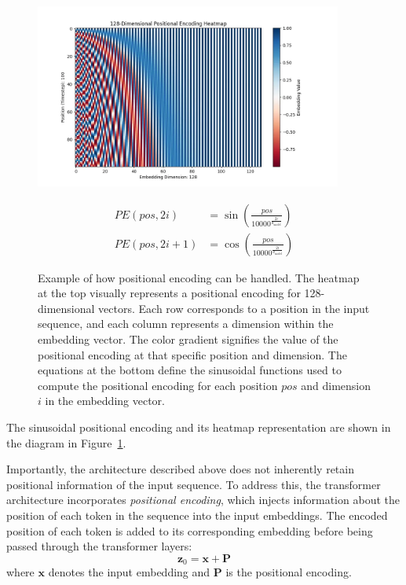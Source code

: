 \documentclass{pracalicmgr}
\begin{document}
\begin{figure}[H]
    \centering
    \begin{minipage}{\textwidth}
        \centering
        \includegraphics[width=0.9\textwidth]{src/embedings.png}
    \end{minipage}
    \vspace{0.2cm}
    \begin{minipage}{\textwidth}
        \centering
        \begin{align*}
        PE(pos, 2i) &= \sin\left(\frac{pos}{10000^{\frac{2i}{d_{\text{model}}}}}\right) \\
        PE(pos, 2i + 1) &= \cos\left(\frac{pos}{10000^{\frac{2i}{d_{\text{model}}}}}\right)
        \end{align*}
    \end{minipage}
    \label{fig:positionalEncoding}
    \caption{Example of how positional encoding can be handled. The heatmap at the top visually represents a positional encoding for 128-dimensional vectors. Each row corresponds to a position in the input sequence, and each column represents a dimension within the embedding vector. The color gradient signifies the value of the positional encoding at that specific position and dimension. The equations at the bottom define the sinusoidal functions used to compute the positional encoding for each position \( pos \) and dimension \( i \) in the embedding vector.}
\end{figure}

The sinusoidal positional encoding and its heatmap representation are shown in the diagram in Figure~\ref{fig:positionalEncoding}.

Importantly, the architecture described above does not inherently retain positional information of the input sequence. To address this, the transformer architecture incorporates \textit{positional encoding}, which injects information about the position of each token in the sequence into the input embeddings. The encoded position of each token is added to its corresponding embedding before being passed through the transformer layers:
\[
\mathbf{z}_0 = \mathbf{x} + \mathbf{P}
\]
where \( \mathbf{x} \) denotes the input embedding and \( \mathbf{P} \) is the positional encoding.
\end{document}
